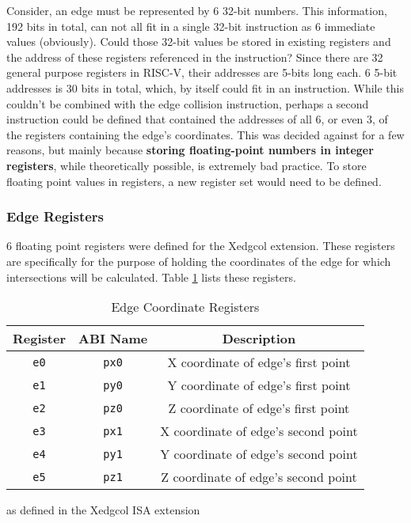     Consider, an edge must be represented by 6 32-bit numbers. This information, 192 bits in total, can not all fit in a single 32-bit instruction as 6 immediate values (obviously). Could those 32-bit values be stored in existing registers and the address of these registers referenced in the instruction? Since there are 32 general purpose registers in RISC-V, their addresses are 5-bits long each. 6 5-bit addresses is 30 bits in total, which, by itself could fit in an instruction. While this couldn't be combined with the edge collision instruction, perhaps a second instruction could be defined that contained the addresses of all 6, or even 3, of the registers containing the edge's coordinates. This was decided against for a few reasons, but mainly because \textbf{storing floating-point numbers in integer registers}, while theoretically possible, is extremely bad practice. To store floating point values in registers, a new register set would need to be defined.

    \subsubsection{Edge Registers}
    6 floating point registers were defined for the Xedgcol extension. These registers are specifically for the purpose of holding the coordinates of the edge for which intersections will be calculated. Table \ref{table:edge_registers} lists these registers.

    \begin{table}
    \begin{center}
    \begin{tabular}{|c|c|c|}
    \hline
    \textbf{Register} & \textbf{ABI Name} & \textbf{Description} \\
    \hline
    \texttt{e0}     & \texttt{px0}      & X coordinate of edge's first point \\
    \hline
    \texttt{e1}     & \texttt{py0}      & Y coordinate of edge's first point \\
    \hline
    \texttt{e2}     & \texttt{pz0}      & Z coordinate of edge's first point \\
    \hline
    \texttt{e3}     & \texttt{px1}      & X coordinate of edge's second point \\
    \hline
    \texttt{e4}     & \texttt{py1}      & Y coordinate of edge's second point \\
    \hline
    \texttt{e5}     & \texttt{pz1}      & Z coordinate of edge's second point \\
    \hline
    \end{tabular}
    \caption{Edge Coordinate Registers}{ as defined in the Xedgcol ISA extension}
    \label{table:edge_registers}
    \end{center}
    \end{table}

